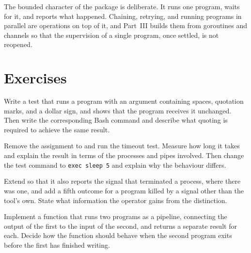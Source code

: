 The bounded character of the  package is deliberate. It runs one program, waits for it, and reports what happened. Chaining, retrying, and running programs in parallel are operations on top of it, and Part~III builds them from goroutines and channels so that the supervision of a single program, once settled, is not reopened.

\section*{Exercises}

\begin{exercise}
Write a test that runs a program with an argument containing spaces, quotation marks, and a dollar sign, and shows that the program receives it unchanged. Then write the corresponding Bash command and describe what quoting is required to achieve the same result.
\end{exercise}

\begin{exercise}
Remove the assignment to  and run the timeout test. Measure how long it takes and explain the result in terms of the processes and pipes involved. Then change the test command to \texttt{exec sleep 5} and explain why the behaviour differs.
\end{exercise}

\begin{exercise}
Extend  so that it also reports the signal that terminated a process, where there was one, and add a fifth outcome for a program killed by a signal other than the tool's own. State what information the operator gains from the distinction.
\end{exercise}

\begin{exercise}
Implement a function that runs two programs as a pipeline, connecting the output of the first to the input of the second, and returns a separate result for each. Decide how the function should behave when the second program exits before the first has finished writing.
\end{exercise}
